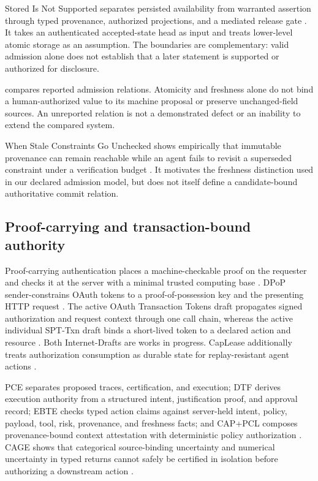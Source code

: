 Stored Is Not Supported separates persisted availability from warranted assertion through typed provenance, authorized projections, and a mediated release gate \citep{he2026stored}. It takes an authenticated accepted-state head as input and treats lower-level atomic storage as an assumption. The boundaries are complementary: valid admission alone does not establish that a later statement is supported or authorized for disclosure.

 compares reported admission relations. Atomicity and freshness alone do not bind a human-authorized value to its machine proposal or preserve unchanged-field sources. An unreported relation is not a demonstrated defect or an inability to extend the compared system.

When Stale Constraints Go Unchecked shows empirically that immutable provenance can remain reachable while an agent fails to revisit a superseded constraint under a verification budget \citep{nakayashiki2026staleconstraints}. It motivates the freshness distinction used in our declared admission model, but does not itself define a candidate-bound authoritative commit relation.



\subsection{Proof-carrying and transaction-bound authority}

Proof-carrying authentication places a machine-checkable proof on the requester and checks it at the server with a minimal trusted computing base \citep{appel1999pca}. DPoP sender-constrains OAuth tokens to a proof-of-possession key and the presenting HTTP request \citep{fett2023dpop}. The active OAuth Transaction Tokens draft propagates signed authorization and request context through one call chain, whereas the active individual SPT-Txn draft binds a short-lived token to a declared action and resource \citep{tulshibagwale2026txtokens,coetzee2026spttxn}. Both Internet-Drafts are works in progress. CapLease additionally treats authorization consumption as durable state for replay-resistant agent actions \citep{xu2026caplease}.

PCE separates proposed traces, certification, and execution; DTF derives execution authority from a structured intent, justification proof, and approval record; EBTE checks typed action claims against server-held intent, policy, payload, tool, risk, provenance, and freshness facts; and CAP+PCL composes provenance-bound context attestation with deterministic policy authorization \citep{liu2026pce,he2026dtf,zhu2026ebte,chitan2026cappcl}. CAGE shows that categorical source-binding uncertainty and numerical uncertainty in typed returns cannot safely be certified in isolation before authorizing a downstream action \citep{delattre2026cage}.

